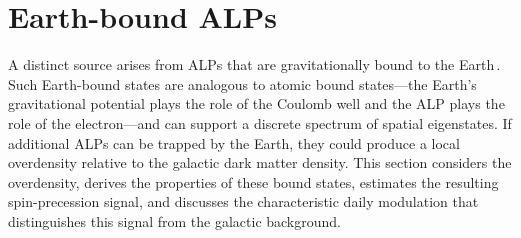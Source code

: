 
\section{Earth-bound ALPs}\label{sec:theory:earthALP}












A distinct source arises from ALPs that are gravitationally bound to the Earth\,\cite{banerjee2020_AxionHalos}.
Such Earth-bound states are analogous to atomic bound states---the Earth's gravitational potential plays the role of the Coulomb well and the ALP plays the role of the electron---and can support a discrete spectrum of spatial eigenstates.
If additional ALPs can be trapped by the Earth, they could produce a local overdensity relative to the galactic dark matter density.
This section considers the overdensity, derives the properties of these bound states, estimates the resulting spin-precession signal, and discusses the characteristic daily modulation that distinguishes this signal from the galactic background.

